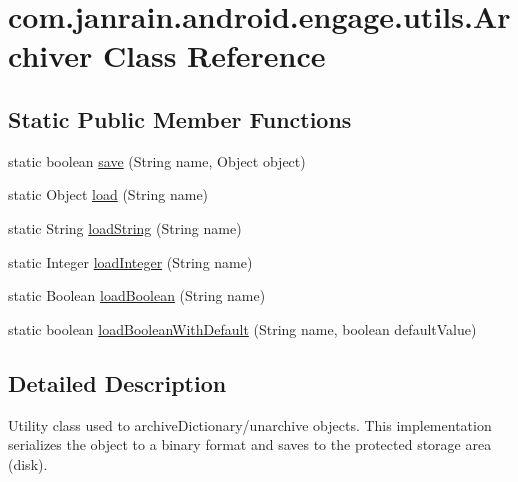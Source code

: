 \hypertarget{classcom_1_1janrain_1_1android_1_1engage_1_1utils_1_1_archiver}{
\section{com.janrain.android.engage.utils.Archiver Class Reference}
\label{classcom_1_1janrain_1_1android_1_1engage_1_1utils_1_1_archiver}
}
\subsection*{Static Public Member Functions}
\begin{DoxyCompactItemize}
\item 
static boolean \hyperlink{classcom_1_1janrain_1_1android_1_1engage_1_1utils_1_1_archiver_af076b6e5a9be6b616fa7b80903a2536a}{save} (String name, Object object)
\item 
static Object \hyperlink{classcom_1_1janrain_1_1android_1_1engage_1_1utils_1_1_archiver_a51b9d13ed8a6cb8bbf75961ca454e429}{load} (String name)
\item 
static String \hyperlink{classcom_1_1janrain_1_1android_1_1engage_1_1utils_1_1_archiver_a169544853f8d3386f06a46ead2b8faf6}{loadString} (String name)
\item 
static Integer \hyperlink{classcom_1_1janrain_1_1android_1_1engage_1_1utils_1_1_archiver_aa7d09e66d7c86ed2faceb00ffce7edb2}{loadInteger} (String name)
\item 
static Boolean \hyperlink{classcom_1_1janrain_1_1android_1_1engage_1_1utils_1_1_archiver_a9fefb3466223a7df6370ed5faa76422a}{loadBoolean} (String name)
\item 
static boolean \hyperlink{classcom_1_1janrain_1_1android_1_1engage_1_1utils_1_1_archiver_a4b60e73436728316e49df08422392e66}{loadBooleanWithDefault} (String name, boolean defaultValue)
\end{DoxyCompactItemize}


\subsection{Detailed Description}
Utility class used to archiveDictionary/unarchive objects. This implementation serializes the object to a binary format and saves to the protected storage area (disk). 


